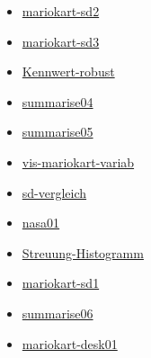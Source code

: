 \documentclass[
  letterpaper,
]{scrbook}
\providecommand{\tightlist}{%
  \setlength{\itemsep}{0pt}\setlength{\parskip}{0pt}}\usepackage{longtable,booktabs,array}
\theoremstyle{definition}
\theoremstyle{definition}
\theoremstyle{definition}
\theoremstyle{remark}
\begin{document}
\begin{itemize}
\tightlist
\item
  \href{https://datenwerk.netlify.app/posts/mariokart-sd2/mariokart-sd2}{mariokart-sd2}
\item
  \href{https://datenwerk.netlify.app/posts/mariokart-sd3/mariokart-sd3}{mariokart-sd3}
\item
  \href{https://datenwerk.netlify.app/posts/kennwert-robust/kennwert-robust}{Kennwert-robust}
\item
  \href{https://datenwerk.netlify.app/posts/summarise04/summarise04}{summarise04}
\item
  \href{https://datenwerk.netlify.app/posts/summarise05/summarise05}{summarise05}
\item
  \href{https://datenwerk.netlify.app/posts/vis-mariokart-variab/vis-mariokart-variab}{vis-mariokart-variab}
\item
  \href{https://datenwerk.netlify.app/posts/sd-vergleich/sd-vergleich}{sd-vergleich}
\item
  \href{https://datenwerk.netlify.app/posts/nasa01/nasa01}{nasa01}
\item
  \href{https://datenwerk.netlify.app/posts/streuung-histogramm/streuung-histogramm}{Streuung-Histogramm}
\item
  \href{https://datenwerk.netlify.app/posts/mariokart-sd1/mariokart-sd1}{mariokart-sd1}
\item
  \href{https://datenwerk.netlify.app/posts/summarise06/summarise06}{summarise06}
\item
  \href{https://datenwerk.netlify.app/posts/mariokart-desk01/mariokart-desk01}{mariokart-desk01}
\end{itemize}
\end{document}
